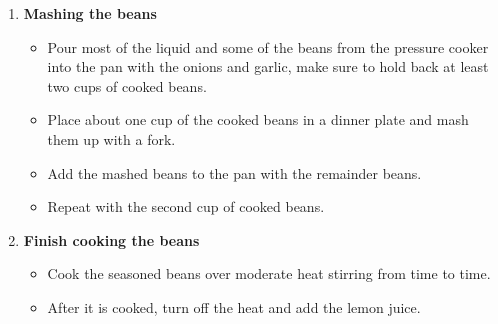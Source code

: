 \documentclass[11pt,letterpaper]{article}
\begin{document}
\begin{description}
\begin{enumerate}
	\item {\bf Mashing the beans}
	\begin{itemize}
	\item  Pour most of the liquid and some of the beans from the pressure cooker into the pan with the onions and garlic, make sure to hold back at least two cups of cooked beans.
	\item Place about one cup of the cooked beans in a dinner plate and mash them up with a fork. 
	\item Add the mashed beans to the pan with the remainder beans.
	\item Repeat with the second cup of cooked beans.
	\end{itemize}
	
	\item {\bf Finish cooking the beans}
	\begin{itemize}
	\item Cook the seasoned beans over moderate heat stirring from time to time.
	\item After it is cooked, turn off the heat and add the lemon juice.
	\end{itemize}
	\end{enumerate}
\end{description}
\end{document}
